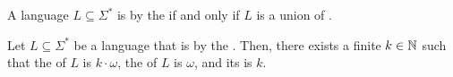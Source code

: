 \begin{theorem}
    A language $L \subseteq \Sigma^*$ is  by the
     if and only if $L$ is a union of .
\end{theorem}

\begin{corollary}
    Let $L \subseteq \Sigma^*$ be a language that is  by
    the . Then, there exists a finite $k \in \mathbb{N}$ such that
    the
     of $L$ is $k \cdot \omega$,
    the  of $L$ is $\omega$, and its
     is $k$.
\end{corollary}

